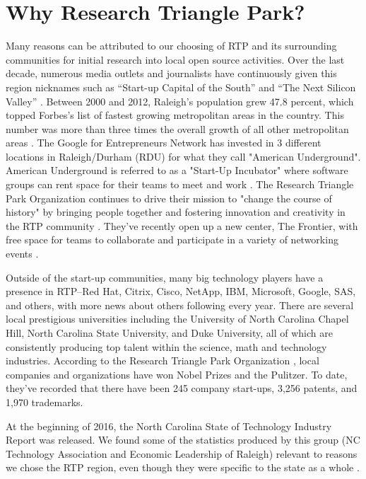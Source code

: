 \section{Why Research Triangle Park?}

Many reasons can be attributed to our choosing of RTP and its surrounding communities for initial research into local open source activities. Over the last decade, numerous media outlets and journalists have continuously given this region nicknames such as “Start-up Capital of the South” \cite{_durhams_????} and “The Next Silicon Valley” \cite{_4_????}. Between 2000 and 2012, Raleigh's population grew 47.8 percent, which topped Forbes's list of fastest growing metropolitan areas in the country. This number was more than three times the overall growth of all other metropolitan areas \cite{kotkin_americas_????}. The Google for Entrepreneurs Network has invested in 3 different locations in Raleigh/Durham (RDU) for what they call "American Underground". American Underground is referred to as a "Start-Up Incubator" where software groups can rent space for their teams to meet and work \cite{_american_????}. The Research Triangle Park Organization continues to drive their mission to "change the course of history" by bringing people together and fostering innovation and creativity in the RTP community \cite{_research_2016}. They've recently open up a new center, The Frontier, with free space for teams to collaborate and participate in a variety of networking events \cite{_frontier_????}. 

Outside of the start-up communities, many big technology players have a presence in RTP--Red Hat, Citrix, Cisco, NetApp, IBM, Microsoft, Google, SAS, and others,  with more news about others following every year. There are several local prestigious universities including the University of North Carolina Chapel Hill, North Carolina State University, and Duke University, all of which are consistently producing top talent within the science, math and technology industries. According to the Research Triangle Park Organization \cite{_research_2016}, local companies and organizations have won Nobel Prizes and the Pulitzer. To date, they've recorded that there have been 245 company start-ups, 3,256 patents, and 1,970 trademarks. 

At the beginning of 2016, the North Carolina State of Technology Industry Report was released. We found some of the statistics produced by this group (NC Technology Association and Economic Leadership of Raleigh) relevant to reasons we chose the RTP region, even though they were specific to the state as a whole \cite{_nc_????}. 

